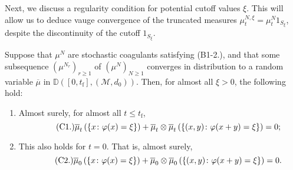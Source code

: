 Next, we discuss a regularity condition for potential cutoff values $\xi$. This will allow us to deduce vauge convergence of the truncated measures $\mu^{N,\xi}_t=\mu^N_t1_{S_\xi}$, despite the discontinuity of the cutoff $1_{S_\xi}$.
\begin{lemma}\label{lemma: regularity condition} Suppose that $\mu^N$ are stochastic coagulants satisfying (B1-2.), and that some subsequence $(\mu^{N_r})_{r\ge 1}$ of $(\mu^N)_{N\ge 1}$ converges in distribution to a random variable $\overline{\mu}$ in $\mathbb{D}([0,t_\mathrm{f}],(\mathcal{M},d_0))$. Then, for almost all $\xi>0$, the following hold: \begin{enumerate}[label=\roman{*}).]\item Almost surely, for  almost all $t\le t_\mathrm{f}$, \begin{equation} \label{eq: reg} \tag{{C1.}}
   \overline{\mu}_t\left(\left\{x\colon \varphi(x) = \xi\right\}\right) + 
    \overline{\mu}_t \otimes \overline{\mu}_t \left(\left\{(x,y) \colon \varphi(x+y) = \xi\right\}\right) = 0;
\end{equation} \item This also holds for $t=0$. That is, almost surely, \begin{equation} \label{eq: reg2} \tag{{C2.}}
   \overline{\mu}_0\left(\left\{x\colon \varphi(x) = \xi\right\}\right) + 
    \overline{\mu}_0 \otimes \overline{\mu}_0 \left(\left\{(x,y) \colon \varphi(x+y) = \xi\right\}\right) = 0. 

\end{equation}
\end{enumerate}
\end{lemma}
